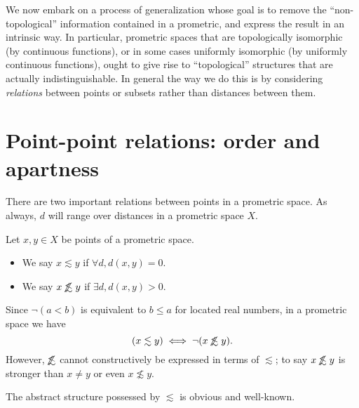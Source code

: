 \documentclass{article}
\def\oapt{\mathrel{\!\not\,\not\lesssim}}
\def\leapx{\lesssim}
\begin{document}

We now embark on a process of generalization whose goal is to remove the ``non-topological'' information contained in a prometric, and express the result in an intrinsic way.
In particular, prometric spaces that are topologically isomorphic (by continuous functions), or in some cases uniformly isomorphic (by uniformly continuous functions), ought to give rise to ``topological'' structures that are actually indistinguishable.
In general the way we do this is by considering \emph{relations} between points or subsets rather than distances between them.


\section{Point-point relations: order and apartness}
\label{sec:point-point}
\label{sec:order}

There are two important relations between points in a prometric space.
As always, $d$ will range over distances in a prometric space $X$.

\begin{defn}\label{def:promet-ord}
  Let $x,y\in X$ be points of a prometric space.
  \begin{itemize}
  \item We say $x\leapx y$ if $\forall d, d(x,y)=0$.
  \item We say $x\oapt y$ if $\exists d, d(x,y)>0$.
  \end{itemize}
\end{defn}

Since $\neg(a<b)$ is equivalent to $b\le a$ for located real numbers, in a prometric space we have
\begin{equation}
  (x\leapx y) \iff \neg(x\oapt y).\label{eq:leapx-oapt}
\end{equation}
However, $\oapt$ cannot constructively be expressed in terms of $\leapx$; to say $x\oapt y$ is stronger than $x\neq y$ or even $x\not\leapx y$.

The abstract structure possessed by $\leapx$ is obvious and well-known.
\end{document}
